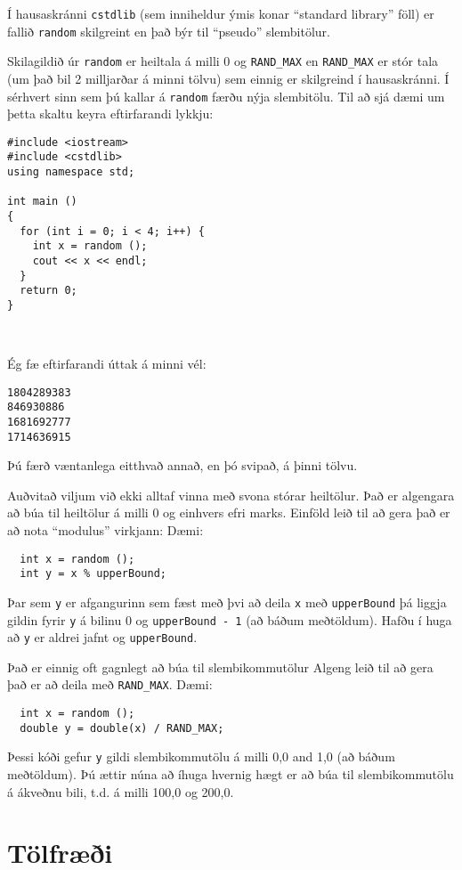 Í hausaskránni {\tt cstdlib} (sem inniheldur ýmis konar ``standard library'' föll) er fallið {\tt random} skilgreint en það býr til ``pseudo'' slembitölur.

Skilagildið úr {\tt random} er heiltala á milli 0 og {\tt RAND\_MAX}
en {\tt RAND\_MAX} er stór tala (um það bil 2 milljarðar á minni tölvu) sem einnig er skilgreind í hausaskránni.
Í sérhvert sinn sem þú kallar á {\tt random} færðu nýja slembitölu.
Til að sjá dæmi um þetta skaltu keyra eftirfarandi lykkju:

\begin{verbatim}
#include <iostream>
#include <cstdlib>
using namespace std;

int main ()
{
  for (int i = 0; i < 4; i++) {
    int x = random ();
    cout << x << endl;
  }
  return 0;
}

  
\end{verbatim}
%
Ég fæ eftirfarandi úttak á minni vél: 

\begin{verbatim}
1804289383
846930886
1681692777
1714636915
\end{verbatim}
%
Þú færð væntanlega eitthvað annað, en þó svipað, á þinni tölvu.

Auðvitað viljum við ekki alltaf vinna með svona stórar heiltölur.
Það er algengara að búa til heiltölur á milli 0 og einhvers efri marks.
Einföld leið til að gera það er að nota ``modulus'' virkjann:
Dæmi:

\begin{verbatim}
  int x = random ();
  int y = x % upperBound;
\end{verbatim}
%
Þar sem {\tt y} er afgangurinn sem fæst með þvi að deila {\tt x} með {\tt upperBound} þá liggja gildin fyrir {\tt y} á bilinu 0 og {\tt upperBound - 1} (að báðum meðtöldum).
Hafðu í huga að {\tt y} er aldrei jafnt og {\tt upperBound}.

Það er einnig oft gagnlegt að búa til slembikommutölur
Algeng leið til að gera það er að deila með {\tt RAND\_MAX}.
Dæmi:

\begin{verbatim}
  int x = random ();
  double y = double(x) / RAND_MAX;
\end{verbatim}
%
Þessi kóði gefur {\tt y} gildi slembikommutölu á milli 0,0 and 1,0 (að báðum meðtöldum).
Þú ættir núna að íhuga hvernig hægt er að búa til slembikommutölu á ákveðnu bili, t.d. á milli 100,0 og 200,0.

\section{Tölfræði}

